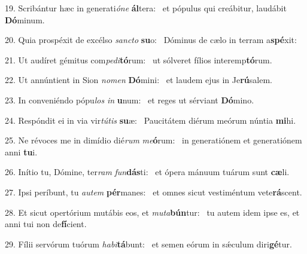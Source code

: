 19. Scribántur hæc in generati\textit{ó}\textit{ne} \textbf{ál}tera: \ast\  et pópulus qui creábitur, laudábit \textbf{Dó}minum.\

20. Quia prospéxit de excélso \textit{sanc}\textit{to} \textbf{su}o: \ast\  Dóminus de cælo in terram a\textbf{spé}xit:\

21. Ut audíret gémitus com\textit{pe}\textit{di}\textbf{tó}rum: \ast\  ut sólveret fílios interemp\textbf{tó}rum.\

22. Ut annúntient in Sion \textit{no}\textit{men} \textbf{Dó}mini: \ast\  et laudem ejus in Je\textbf{rú}salem.\

23. In conveniéndo pópu\textit{los} \textit{in} \textbf{u}num: \ast\  et reges ut sérviant \textbf{Dó}mino.\

24. Respóndit ei in via vir\textit{tú}\textit{tis} \textbf{su}æ: \ast\  Paucitátem diérum meórum núntia \textbf{mi}hi.\

25. Ne révoces me in dimídio dié\textit{rum} \textit{me}\textbf{ó}rum: \ast\  in generatiónem et generatiónem anni \textbf{tu}i.\

26. Inítio tu, Dómine, ter\textit{ram} \textit{fun}\textbf{dás}ti: \ast\  et ópera mánuum tuárum sunt \textbf{cæ}li.\

27. Ipsi períbunt, tu \textit{au}\textit{tem} \textbf{pér}manes: \ast\  et omnes sicut vestiméntum vete\textbf{rá}scent.\

28. Et sicut opertórium mutábis eos, et \textit{mu}\textit{ta}\textbf{bún}tur: \ast\  tu autem idem ipse es, et anni tui non de\textbf{fí}cient.\

29. Fílii servórum tuórum \textit{ha}\textit{bi}\textbf{tá}bunt: \ast\  et semen eórum in sǽculum diri\textbf{gé}tur.\

